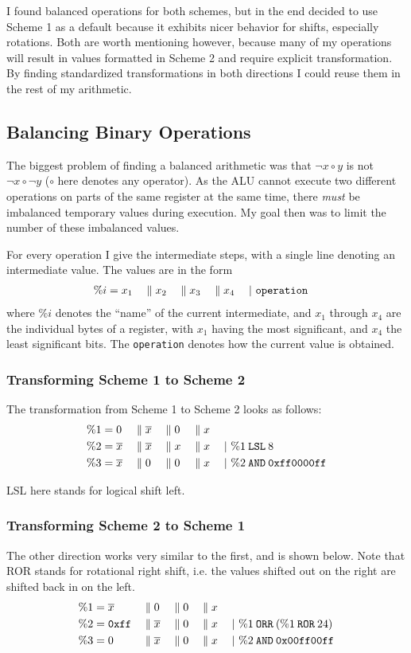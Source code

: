 I found balanced operations for both schemes, but in the end decided to use Scheme 1 as a default because it exhibits nicer behavior for shifts, especially rotations.
Both are worth mentioning however, because many of my operations will result in values formatted in Scheme 2 and require explicit transformation.
By finding standardized transformations in both directions I could reuse them in the rest of my arithmetic.

\subsection{Balancing Binary Operations}
\label{operations}
The biggest problem of finding a balanced arithmetic was that $\neg{x \circ y}$ is not $\neg{x} \circ \neg{y}$ ($\circ$ here denotes any operator).
As the ALU cannot execute two different operations on parts of the same register at the same time, there \emph{must} be imbalanced temporary values during execution.
My goal then was to limit the number of these imbalanced values.

For every operation I give the intermediate steps, with a single line denoting an intermediate value.
The values are in the form
\begin{align*}
  \%i &= x_1 &&\; \| \; x_2 &&\; \| \; x_3 &&\; \| \; x_4 && \;|\ \texttt{operation}
\end{align*}
where $\%i$ denotes the ``name'' of the current intermediate, and $x_1$ through $x_4$ are the individual bytes of a register, with $x_1$ having the most significant, and $x_4$ the least significant bits.
The \texttt{operation} denotes how the current value is obtained.


\subsubsection{Transforming Scheme 1 to Scheme 2}
The transformation from Scheme 1 to Scheme 2 looks as follows:
\begin{align*}
  \%1 &= 0 &&\; \| \; \overline{x} &&\; \| \; 0 &&\; \| \; x &&\\
  \%2 &= \overline{x} &&\; \| \; \overline{x} &&\; \| \; x &&\; \| \; x && \;|\ \%1 \mathbin{\texttt{LSL}} 8\\
  \%3 &= \overline{x} &&\; \| \; 0 &&\; \| \; 0 &&\; \| \; x && \;|\ \%2 \mathbin{\texttt{AND}} \texttt{0xff0000ff}
\end{align*}

LSL here stands for logical shift left.

\subsubsection{Transforming Scheme 2 to Scheme 1}
The other direction works very similar to the first, and is shown below.
Note that ROR stands for rotational right shift, i.e. the values shifted out on the right are shifted back in on the left.
\begin{align*}
  \%1 &= \overline{x} &&\; \| \; 0 &&\; \| \; 0 &&\; \| \; x &&\\
  \%2 &= \texttt{0xff} &&\; \| \; \overline{x} &&\; \| \; 0 &&\; \| \; x && \;|\ \%1 \mathbin{\texttt{ORR}} (\%1 \mathbin{\texttt{ROR}} 24)\\
  \%3 &= 0 &&\; \| \; \overline{x} &&\; \| \; 0 &&\; \| \; x && \;|\ \%2 \mathbin{\texttt{AND}} \texttt{0x00ff00ff}
\end{align*}

